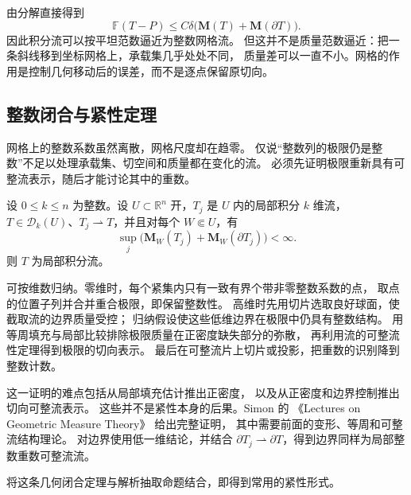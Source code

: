由分解直接得到
\[
 \mathbb F(T-P)\leq
       C\delta\bigl(\mathbf M(T)+\mathbf M(\partial T)\bigr).
\]
因此积分流可以按平坦范数逼近为整数网格流。
但这并不是质量范数逼近：把一条斜线移到坐标网格上，承载集几乎处处不同，
质量差可以一直不小。网格的作用是控制几何移动后的误差，而不是逐点保留原切向。

\subsection{整数闭合与紧性定理}
\label{b1:subsec:D10504}

网格上的整数系数虽然离散，网格尺度却在趋零。
仅说“整数列的极限仍是整数”不足以处理承载集、切空间和质量都在变化的流。
必须先证明极限重新具有可整流表示，随后才能讨论其中的重数。

\begin{theorem}\label{b1:thm:app-d-integral-closure}
设 \(0\le k\le n\) 为整数。设 \(U\subset\mathbb R^n\) 开，\(T_j\) 是 \(U\) 内的局部积分 \(k\) 维流，
\(T\in\mathcal D_k(U)\)、\(T_j\rightharpoonup T\)，并且对每个 \(W\Subset U\)，有
\[
 \sup_j\bigl(\mathbf M_W(T_j)+\mathbf M_W(\partial T_j)\bigr)<\infty.
\]
则 \(T\) 为局部积分流。
\end{theorem}
\begin{proofsketch}
可按维数归纳。零维时，每个紧集内只有一致有界个带非零整数系数的点，
取点的位置子列并合并重合极限，即保留整数性。
高维时先用切片选取良好球面，使截取流的边界质量受控；
归纳假设使这些低维边界在极限中仍具有整数结构。
用等周填充与局部比较排除极限质量在正密度缺失部分的弥散，
再利用流的可整流性定理得到极限的切向表示。
最后在可整流片上切片或投影，把重数的识别降到整数计数。

这一证明的难点包括从局部填充估计推出正密度，
以及从正密度和边界控制推出切向可整流表示。
这些并不是\WeakStar{}紧性本身的后果。Simon 的
《Lectures on Geometric Measure Theory》%
\cite[32.1 THEOREM, 32.2 THEOREM, and 32.3 REMARKS]{Simon1983Lectures}给出完整证明，
其中需要前面的变形、等周和可整流结构理论。
对边界使用低一维结论，并结合
\(\partial T_j\rightharpoonup\partial T\)，得到边界同样为局部整数重数可整流流。
\end{proofsketch}

将这条几何闭合定理与解析抽取命题结合，即得到常用的紧性形式。

